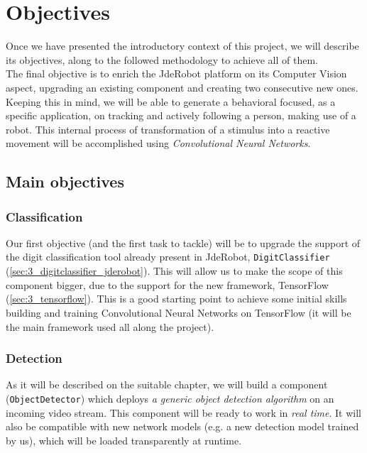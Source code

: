 \chapter{Objectives}
Once we have presented the introductory context of this project, we will describe its objectives, along to the followed methodology to achieve all of them.\\

The final objective is to enrich the JdeRobot platform on its Computer Vision aspect, upgrading an existing component and creating two consecutive new ones. Keeping this in mind, we will be able to generate a behavioral focused, as a specific application, on tracking and actively following a person, making use of a robot. This internal process of transformation of a stimulus into a reactive movement will be accomplished using \textit{Convolutional Neural Networks}.\\


\section{Main objectives}

		\subsection{Classification}
			Our first objective (and the first task to tackle) will be to upgrade the support of the digit classification tool already present in JdeRobot, \texttt{DigitClassifier} (\autoref{sec:3_digitclassifier_jderobot}). This will allow us to make the scope of this component bigger, due to the support for the new framework, TensorFlow (\autoref{sec:3_tensorflow}). This is a good starting point to achieve some initial skills building and training Convolutional Neural Networks on TensorFlow (it will be the main framework used all along the project).\\
		
		
		\subsection{Detection}
			As it will be described on the suitable chapter, we will build a component (\texttt{ObjectDetector}) which deploys \textit{a generic object detection algorithm} on an incoming video stream. This component will be ready to work in \emph{real time}. It will also be compatible with new network models (e.g. a new detection model trained by us), which will be loaded transparently at runtime.\\
			
